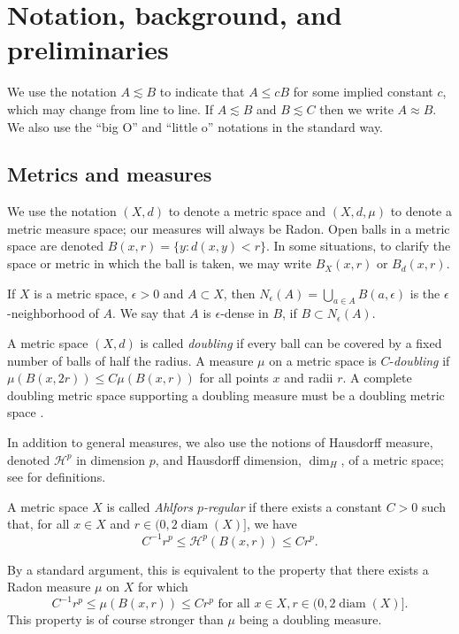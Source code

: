 \documentclass{amsart}
\DeclareMathOperator{\diam}{diam}
\theoremstyle{plain}
\theoremstyle{definition}
\numberwithin{equation}{section}
\numberwithin{theorem}{section}
\newcommand{\HH}{\mathcal{H}}
\begin{document}
\section{Notation, background, and preliminaries}\label{sec:prelims}
We use the notation $A\lesssim B$ to indicate that $A\leq cB$ for some implied constant $c$, which may change from line to line. If $A\lesssim B$ and $B\lesssim C$ then we write $A\approx B$. We also use the ``big O'' and ``little o'' notations in the standard way.

\subsection{Metrics and measures}

We use the notation $(X,d)$ to denote a metric space and $(X,d,\mu)$ to denote a metric measure space; our measures will always be Radon. Open balls in a metric space are denoted $B(x,r)=\{y: d(x,y)<r\}$. In some situations, to clarify the space or metric in which the ball is taken, we may write $B_X(x,r)$ or $B_d(x,r)$.

If $X$ is a metric space, $\epsilon>0$ and $A\subset X$, then $N_\epsilon(A)=\bigcup_{a\in A} B(a,\epsilon)$ is the $\epsilon$-neighborhood of $A$. We say that $A$ is $\epsilon$-dense in $B$, if $B\subset N_\epsilon(A)$.  

A metric space $(X,d)$ is called \emph{doubling} if every ball can be covered by a fixed number of balls of half the radius. A measure $\mu$ on a metric space is $C$-\emph{doubling} if $\mu(B(x,2r))\leq C\mu(B(x,r))$ for all points $x$ and radii $r$. A complete doubling metric space supporting a doubling measure must be a doubling metric space \cite[Ch. 13]{He}.

In addition to general measures, we also use the notions of Hausdorff measure, denoted $\HH^p$ in dimension $p$, and Hausdorff dimension, $\dim_H$, of a metric space; see \cite[Ch. 8]{He} for definitions.

A metric space $X$ is called \emph{Ahlfors $p$-regular} if there exists a constant $C>0$ such that, for all $x\in X$ and $r\in (0,2\diam(X)]$, we have
\[
C^{-1}r^p \leq \HH^p(B(x,r)) \leq C r^p.
\]

By a standard argument, this is equivalent to the property that there exists a Radon measure $\mu$ on $X$ for which
\[
C^{-1}r^p \leq \mu(B(x,r)) \leq C r^p \text{ for all }x\in X, r\in (0,2\diam(X)].
\]
This property is of course stronger than $\mu$ being a doubling measure.
\end{document}
